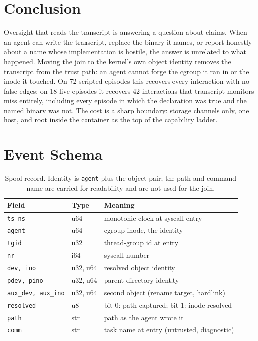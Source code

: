 \documentclass[11pt]{article}
\begin{document}
\section{Conclusion}

Oversight that reads the transcript is answering a question about claims. When an
agent can write the transcript, replace the binary it names, or report honestly
about a name whose implementation is hostile, the answer is unrelated to what
happened. Moving the join to the kernel's own object identity removes the
transcript from the trust path: an agent cannot forge the cgroup it ran in or the
inode it touched. On 72 scripted episodes this recovers every interaction with no
false edges; on 18 live episodes it recovers 42 interactions that transcript
monitors miss entirely, including every episode in which the declaration was true
and the named binary was not. The cost is a sharp boundary: storage channels only,
one host, and root inside the container as the top of the capability ladder.



\appendix

\section{Event Schema}

\begin{table}[h]
\centering
\small
\begin{tabular}{@{}lll@{}}
\toprule
Field & Type & Meaning \\
\midrule
\texttt{ts\_ns}     & u64 & monotonic clock at syscall entry \\
\texttt{agent}      & u64 & cgroup inode, the identity \\
\texttt{tgid}       & u32 & thread-group id at entry \\
\texttt{nr}         & i64 & syscall number \\
\texttt{dev, ino}   & u32, u64 & resolved object identity \\
\texttt{pdev, pino} & u32, u64 & parent directory identity \\
\texttt{aux\_dev, aux\_ino} & u32, u64 & second object (rename target, hardlink) \\
\texttt{resolved}   & u8  & bit 0: path captured; bit 1: inode resolved \\
\texttt{path}       & str & path as the agent wrote it \\
\texttt{comm}       & str & task name at entry (untrusted, diagnostic) \\
\bottomrule
\end{tabular}
\caption{Spool record. Identity is \texttt{agent} plus the object pair; the path
and command name are carried for readability and are not used for the join.}
\end{table}
\end{document}

